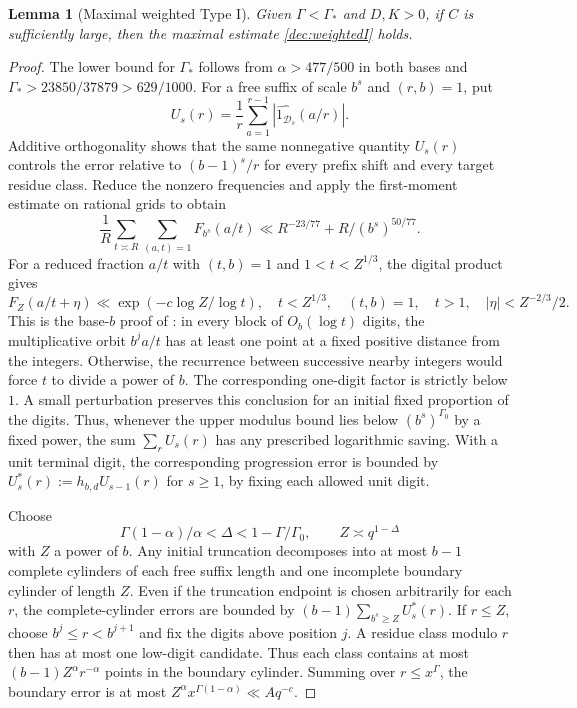 \documentclass[11pt,a4paper]{article}
\theoremstyle{paperplain}
\newtheorem{lemma}[theorem]{Lemma}
\numberwithin{equation}{section}
\begin{document}
\begin{lemma}[Maximal weighted Type I]\label{dec:typeI}
Given $\Gamma<\Gamma_*$ and $D,K>0$, if $C$ is sufficiently
large, then the maximal estimate \eqref{dec:weightedI} holds.
\end{lemma}
\begin{proof}
The lower bound for $\Gamma_*$ follows from $\alpha>477/500$ in
both bases and
$\Gamma_*>23850/37879>629/1000$.
For a free suffix of scale $b^s$ and $(r,b)=1$, put
\[
 U_s(r)=\frac1r\sum_{a=1}^{r-1}
   |\widehat{1_{\mathcal D_s}}(a/r)|.
\]
Additive orthogonality shows that the same nonnegative quantity
$U_s(r)$ controls the error relative to $(b-1)^s/r$ for every prefix
shift and every target residue class.
Reduce the nonzero frequencies and apply the first-moment estimate
on rational grids to obtain
\[
 \frac1R\sum_{t\asymp R}\sum_{(a,t)=1}F_{b^s}(a/t)
 \ll R^{-23/77}+R/(b^s)^{50/77}.
\]
For a reduced fraction $a/t$ with $(t,b)=1$ and $1<t<Z^{1/3}$,
the digital product gives
\[
 F_Z(a/t+\eta)\ll\exp(-c\log Z/\log t),\quad
 t<Z^{1/3},\quad(t,b)=1,\quad t>1,\quad |\eta|<Z^{-2/3}/2.
\]
This is the base-$b$ proof of \cite[Lemmas 8.1--8.2]{Maynard2019}:
in every block of $O_b(\log t)$ digits, the multiplicative orbit
$b^ja/t$ has at least one point at a fixed positive distance from the
integers. Otherwise, the recurrence between successive nearby integers
would force $t$ to divide a power of $b$.
The corresponding one-digit factor is strictly below $1$.
A small perturbation preserves this conclusion for an initial fixed
proportion of the digits. Thus, whenever the upper modulus bound lies
below $(b^s)^{\Gamma_0}$ by a fixed power, the sum $\sum_rU_s(r)$
has any prescribed logarithmic saving.
With a unit terminal digit, the corresponding progression error is
bounded by $U_s^*(r):=h_{b,d}U_{s-1}(r)$ for $s\ge1$, by fixing
each allowed unit digit.

Choose
\[
 \Gamma(1-\alpha)/\alpha<\Delta<1-\Gamma/\Gamma_0,\qquad
 Z\asymp q^{1-\Delta}
\]
with $Z$ a power of $b$. Any initial truncation decomposes into at most
$b-1$ complete cylinders of each free suffix length and one incomplete
boundary cylinder of length $Z$.
Even if the truncation endpoint is chosen arbitrarily for each $r$,
the complete-cylinder errors are bounded by
$(b-1)\sum_{b^s\ge Z}U_s^*(r)$.
If $r\le Z$, choose $b^j\le r<b^{j+1}$ and fix the digits above
position $j$. A
residue class modulo $r$ then has at most one low-digit candidate.
Thus each class contains at most $(b-1)Z^\alpha r^{-\alpha}$
points in the boundary cylinder.
Summing over $r\le x^\Gamma$, the boundary error is at most
$Z^\alpha x^{\Gamma(1-\alpha)}\ll Aq^{-c}$.


\end{proof}
\end{document}

